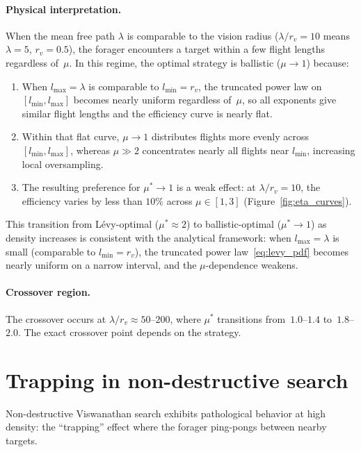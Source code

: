 \paragraph{Physical interpretation.}
When the mean free path $\lambda$ is comparable to the vision
radius ($\lambda/r_v = 10$ means $\lambda = 5$, $r_v = 0.5$),
the forager encounters a target within a few flight lengths
regardless of~$\mu$.  In this regime, the optimal strategy is
ballistic ($\mu \to 1$) because:
\begin{enumerate}
  \item When $l_{\max} = \lambda$ is comparable to
        $l_{\min} = r_v$, the truncated power law
        on $[l_{\min}, l_{\max}]$ becomes nearly uniform
        regardless of~$\mu$, so all exponents give similar
        flight lengths and the efficiency curve is nearly flat.
  \item Within that flat curve, $\mu \to 1$ distributes flights
        more evenly across $[l_{\min}, l_{\max}]$, whereas
        $\mu \gg 2$ concentrates nearly all flights near
        $l_{\min}$, increasing local oversampling.
  \item The resulting preference for $\mu^* \to 1$ is a weak
        effect: at $\lambda/r_v = 10$, the efficiency varies
        by less than $10\%$ across $\mu \in [1, 3]$
        (Figure~\ref{fig:eta_curves}).
\end{enumerate}

This transition from L\'evy-optimal ($\mu^* \approx 2$) to
ballistic-optimal ($\mu^* \to 1$) as density increases is
consistent with the analytical framework:  when
$l_{\max} = \lambda$ is small (comparable to $l_{\min} = r_v$),
the truncated power law~\eqref{eq:levy_pdf} becomes nearly
uniform on a narrow interval, and the $\mu$-dependence weakens.

\paragraph{Crossover region.}
The crossover occurs at $\lambda/r_v \approx 50$--$200$, where
$\mu^*$ transitions from~$1.0$--$1.4$ to~$1.8$--$2.0$.
The exact crossover point depends on the strategy.

\section{Trapping in non-destructive search}

Non-destructive Viswanathan search exhibits pathological
behavior at high density: the ``trapping'' effect where the
forager ping-pongs between nearby targets.

